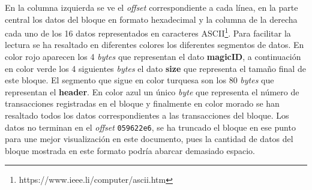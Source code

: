 \documentclass{article}
\begin{document}
    
    En la columna izquierda se ve el \textit{offset} correspondiente a cada línea, en la parte central los datos del bloque en formato hexadecimal y la columna de la derecha cada uno de los 16 datos representados en caracteres ASCII\footnote{https://www.ieee.li/computer/ascii.htm}. Para facilitar la lectura se ha resaltado en diferentes colores los diferentes segmentos de datos. En color rojo aparecen los 4 \textit{bytes} que representan el dato \textbf{magicID}, a continuación en color verde los 4 siguientes \textit{bytes} el dato \textbf{size} que representa el tamaño final de este bloque. El segmento que sigue en color turquesa son los 80 \textit{bytes} que representan el \textbf{header}. En color azul un único \textit{byte} que representa el número de transacciones registradas en el bloque y finalmente en color morado se han resaltado todos los datos correspondientes a las transacciones del bloque. Los datos no terminan en el \textit{offset} \texttt{059622e6}, se ha truncado el bloque en ese punto para une mejor visualización en este documento, pues la cantidad de datos del bloque mostrada en este formato podría abarcar demasiado espacio.
\end{document}

